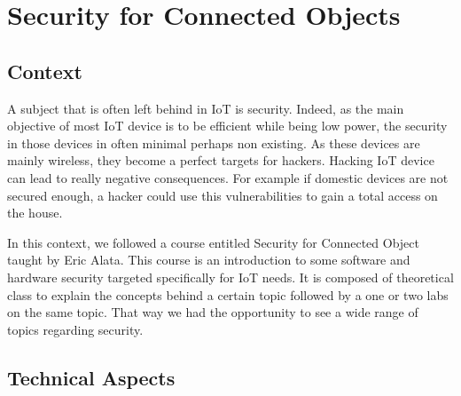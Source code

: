 \section{Security for Connected Objects}

\subsection{Context}

A subject that is often left behind in IoT is security. Indeed, as the main objective of most IoT device is to be efficient while being low power, the security in those devices in often minimal perhaps non existing. As these devices are mainly wireless, they become a perfect targets for hackers. Hacking IoT device can lead to really negative consequences. For example if domestic devices are not secured enough, a hacker could use this vulnerabilities to gain a total access on the house.
\\\par
In this context, we followed a course entitled Security for Connected Object taught by Eric Alata. This course is an introduction to some software and hardware security targeted specifically for IoT needs. It is composed of theoretical class to explain the concepts behind a certain topic followed by a one or two labs on the same topic. That way we had the opportunity to see a wide range of topics regarding security. 

\subsection{Technical Aspects}

